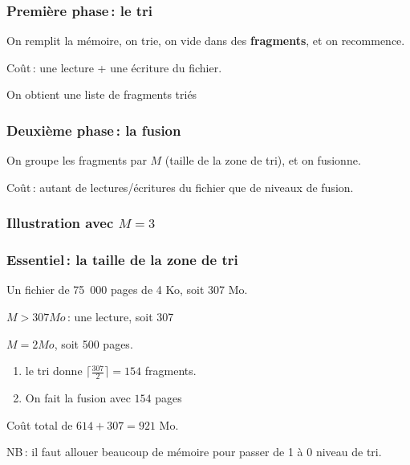 \begin{frame}
\frametitle{Première phase\,: le tri}


On remplit la mémoire, on trie, on vide
dans des \textbf{fragments}, et
on recommence.


Coût\,: une lecture + une écriture du fichier.

\vfill

On obtient une liste de fragments \alert{triés}

\end{frame}

\begin{frame}
\frametitle{Deuxième phase\,: la fusion}


On groupe les fragments par $M$ (taille de la zone
de tri), et on fusionne.\\


Coût\,: autant de lectures/écritures du fichier que de niveaux
de fusion.

\end{frame}

\begin{frame}
\frametitle{Illustration avec $M = 3$}


\end{frame}
\begin{frame}

\frametitle{Essentiel\,: la taille de la zone de tri}

Un fichier de 75~000 pages de 4 Ko, soit 307 Mo.

\vfill

 \textbf{$M > 307 Mo$}\,: une lecture, soit 307 

\vfill

 \textbf{$M = 2 Mo$}, soit 500 pages.
    \begin{enumerate}
      \item le tri donne $\lceil \frac{307}{2} \rceil = 154$
        fragments.

      \item On fait la fusion avec $154$ pages
     \end{enumerate}
       Coût total de $614 + 307 = 921$ Mo. 

\vfill

NB\,: il faut allouer beaucoup de mémoire pour
passer de 1 à 0 niveau de tri.
\end{frame}

